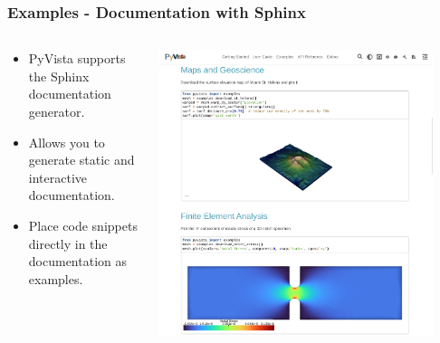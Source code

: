 \documentclass[t]{beamer}
\renewcommand{\small}{\footnotesize}
\renewcommand{\footnotesize}{\scriptsize}
\begin{document}
\begin{frame}
    \frametitle{Examples - Documentation with Sphinx}

    \begin{center}
        \begin{columns}[T]
            \begin{column}{.5\textwidth}
                \small
                \begin{itemize}[leftmargin=10pt, label=•]
                    \item PyVista supports the Sphinx documentation generator.
                    \item Allows you to generate static and interactive documentation.
                    \item Place code snippets directly in the documentation as examples.
                \end{itemize}
                \vspace{40pt}
                \inputminted[fontsize=\footnotesize]{bash}{code/sphinx_conf.py}
            \end{column}

            \begin{column}{.5\textwidth}
                \vspace{-5pt}
                \centering
                \href{https://docs.pyvista.org/}{\includegraphics[width=0.9\textwidth]{figures/sphinx-trans.png}}
            \end{column}
        \end{columns}
    \end{center}

\end{frame}
\end{document}

